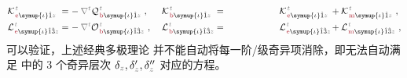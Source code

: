 \begin{subequations}
\begin{align}
	&{\mathcal{K}}^{\;\!\mathcolor{gray}{t}}_{\;\!\textcolor{Maroon}{\text{e}} \symup{\iota}\hat{1} \mathcolor{gray}{z}} \hspace{-1em}&&=\hspace{0.2em} &&\hspace{-1.1em}- \mathcolor{gray}{\nabla^t} {\mathcal{Q}}^{\;\!\mathcolor{gray}{t}}_{\;\!\textcolor{Maroon}{\text{b}} \symup{\iota}\hat{1} \mathcolor{gray}{z}}~, &&\hspace{0.3em} {\mathcal{K}}^{\;\!\mathcolor{gray}{t}}_{\;\!\textcolor{Maroon}{\text{b}} \symup{\iota}\hat{1} \mathcolor{gray}{z}} \hspace{-1em}&&=\hspace{0.2em} ~ \hphantom{- \epsilon^{\hphantom{\symup{\iota}\hat{1}}\hat{2}}_{\symup{\iota} \hat{1}}} {\mathcal{K}}^{\;\!\mathcolor{gray}{t}}_{\;\!\textcolor{Maroon}{\text{e}} \symup{\iota}\hat{1} \mathcolor{gray}{z}} &&\hspace{-1.1em}+ {\mathcal{K}}^{\;\!\mathcolor{gray}{t}}_{\;\!\textcolor{Maroon}{\text{m}} \symup{\iota}\hat{1} \mathcolor{gray}{z}}~, \label{eq:Ke-Kb} \\
	&{\mathcal{L}}^{\;\!\mathcolor{gray}{t}}_{\;\!\textcolor{Maroon}{\text{e}} \symup{\iota}\hat{1}\hat{3} \mathcolor{gray}{z}} \hspace{-1em}&&=\hspace{0.2em} &&\hspace{-1.1em}- \mathcolor{gray}{\nabla^t} {\mathcal{O}}^{\;\!\mathcolor{gray}{t}}_{\;\!\textcolor{Maroon}{\text{b}} \symup{\iota}\hat{1}\hat{3} \mathcolor{gray}{z}}~, &&\hspace{0.3em} {\mathcal{L}}^{\;\!\mathcolor{gray}{t}}_{\;\!\textcolor{Maroon}{\text{b}} \symup{\iota}\hat{1}\hat{3} \mathcolor{gray}{z}} \hspace{-1em}&&=\hspace{0.2em} ~ \hphantom{- \epsilon^{\hphantom{\symup{\iota}\hat{1}}\hat{2}}_{\symup{\iota} \hat{1}}} {\mathcal{L}}^{\;\!\mathcolor{gray}{t}}_{\;\!\textcolor{Maroon}{\text{e}} \symup{\iota}\hat{1}\hat{3} \mathcolor{gray}{z}} &&\hspace{-1.1em}+ {\mathcal{L}}^{\;\!\mathcolor{gray}{t}}_{\;\!\textcolor{Maroon}{\text{m}} \symup{\iota}\hat{1}\hat{3} \mathcolor{gray}{z}}~, \label{eq:Le-Lb}
\end{align}
\end{subequations}
可以验证，上述经典多极理论  并不能自动将每一阶/级奇异项消除，即无法自动满足  中的 3 个奇异层次 ${\delta}_{\mathcolor{gray}{z}},{\delta}'_{\mathcolor{gray}{z}},{\delta}''_{\mathcolor{gray}{z}}$ 对应的方程。

